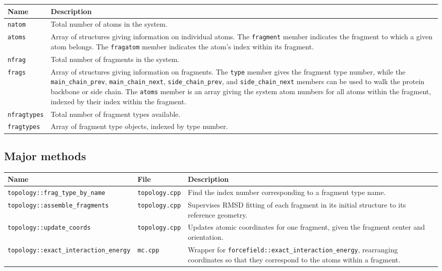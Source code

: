 \documentclass{article}      %
\begin{document}
\begin{tabular}{|p{5cm}|p{11cm}|}
\hline
Name &  Description \\
\hline
\verb+natom+ & Total number of atoms in the system. \\
\hline
\verb+atoms+ & Array of structures giving information on individual atoms.  The \verb+fragment+ member indicates the fragment to which a given atom belongs.  The \verb+fragatom+ member indicates the atom's index within its fragment. \\
\hline
\verb+nfrag+ & Total number of fragments in the system. \\
\hline
\verb+frags+ & Array of structures giving information on fragments.  The \verb+type+ member gives the fragment type number, while the \verb+main_chain_prev+, \verb+main_chain_next+, \verb+side_chain_prev+, and \verb+side_chain_next+ members can be used to walk the protein backbone or side chain.  The \verb+atoms+ member is an array giving the system atom numbers for all atoms within the fragment, indexed by their index within the fragment.  \\
\hline
\verb+nfragtypes+ & Total number of fragment types available. \\
\hline
\verb+fragtypes+ & Array of fragment type objects, indexed by type number. \\
\hline
\end{tabular}

\subsection{Major methods}

\begin{tabular}{|p{7cm}|p{3cm}|p{6cm}|}
\hline
Name & File & Description \\
\hline
\verb+topology::frag_type_by_name+ & \verb+topology.cpp+ & Find the index number corresponding to a fragment type name. \\
\hline
\verb+topology::assemble_fragments+ & \verb+topology.cpp+ &  Supervises RMSD fitting of each fragment in its initial structure to its reference geometry. \\
\hline
\verb+topology::update_coords+ & \verb+topology.cpp+ & Updates atomic coordinates for one fragment, given the fragment center and orientation. \\
\hline
\verb+topology::exact_interaction_energy+ & \verb+mc.cpp+ & Wrapper for \verb+forcefield::exact_interaction_energy+, rearranging coordinates so that they correspond to the atoms within a fragment. \\
\hline
\end{tabular}
\end{document}
